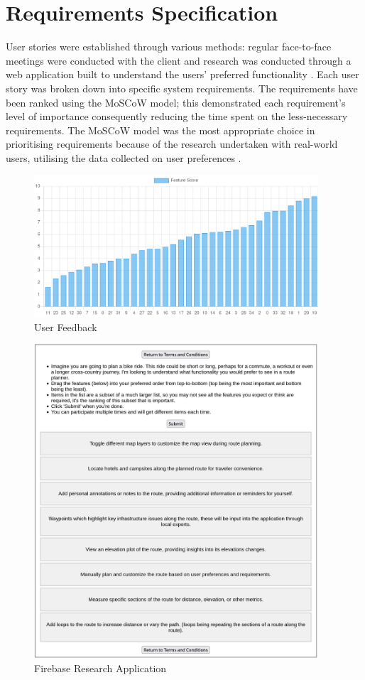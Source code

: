 \section{Requirements Specification}
\label{requirements:specification}

User stories were established through various methods: regular face-to-face meetings were conducted with the client and research was conducted through a web application built to understand the users' preferred functionality . Each user story was broken down into specific system requirements. The requirements have been ranked using the MoSCoW model; this demonstrated each requirement's level of importance consequently reducing the time spent on the less-necessary requirements. The MoSCoW model was the most appropriate choice in prioritising requirements because of the research undertaken with real-world users, utilising the data collected on user preferences .

\begin{figure}[!h]
  \centering
  \includegraphics[width=400px]{figures/logarithmic-scoring.png}
  \caption{User Feedback}
  \label{fig:userfeedback01}
\end{figure}

\begin{figure}
  \centering
  \includegraphics[width=400px]{figures/research-application.png}
  \caption{Firebase Research Application}
  \label{fig:researchapp}
\end{figure}


